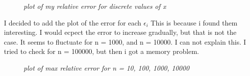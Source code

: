 \documentclass[norsk,a4paper,12pt]{article}
\begin{document}
\begin{figure}[H]
\begin{center}
  \end{center}
  \caption{\textit{plot of my relative error for discrete values of x}}
  \label{fig:edge}
\end{figure}
I decided to add the plot of the error for each $\epsilon_i$ This is because i found them interesting. I would ecpect the error 
to increase gradually, but that is not the case. It seems to fluctuate for n = 1000, and n = 10000. I can not explain this.
I tried to check for n = 100000, but then i got a memory problem. 

\begin{figure}[H]
  \begin{center}
  \end{center}
  \caption{\textit{plot of max relative error for n = 10, 100, 1000, 10000}}
  \label{fig:edge}
\end{figure}
\end{document}
